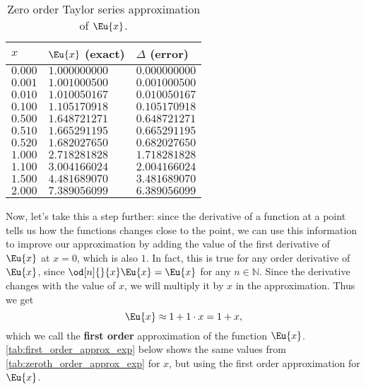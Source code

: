 \begin{table}
  \caption{Zero order Taylor series approximation of $\Eu{x}$.}
  \label{tab:zeroth_order_approx_exp}
  \begin{center}
    {
      \renewcommand{\arraystretch}{1.2}
      \begin{tabular}[c]{lll}
        \toprule
        $x$ & $\Eu{x}$ (exact) & $\Delta$ (error) \\
        \midrule
        $0.000$ & $1.000000000$ & $0.000000000$\\
        $0.001$ & $1.001000500$ & $0.001000500$\\
        $0.010$ & $1.010050167$ & $0.010050167$\\
        $0.100$ & $1.105170918$ & $0.105170918$\\
        $0.500$ & $1.648721271$ & $0.648721271$\\
        $0.510$ & $1.665291195$ & $0.665291195$\\
        $0.520$ & $1.682027650$ & $0.682027650$\\
        $1.000$ & $2.718281828$ & $1.718281828$\\
        $1.100$ & $3.004166024$ & $2.004166024$\\
        $1.500$ & $4.481689070$ & $3.481689070$\\
        $2.000$ & $7.389056099$ & $6.389056099$\\
        \bottomrule
      \end{tabular}
    }
  \end{center}
\end{table}

Now, let's take this a step further: since the derivative of a function at a point tells us how the functions changes close to the point, we can use this information to improve our approximation by adding the value of the first derivative of $\Eu{x}$ at $x=0$, which is also $1$. In fact, this is true for any order derivative of $\Eu{x}$, since $\od[n]{}{x}\Eu{x}=\Eu{x}$ for any $n\in\mathbb{N}$. Since the derivative changes with the value of $x$, we will multiply it by $x$ in the approximation. Thus we get
\begin{equation}
  \Eu{x} \approx 1 + 1\cdot x = 1+x,
  \label{eq:first_order_approx_exp}
\end{equation}
which we call the \textbf{first order} approximation of the function $\Eu{x}$. \autoref{tab:first_order_approx_exp} below shows the same values from \autoref{tab:zeroth_order_approx_exp} for $x$, but using the first order approximation for $\Eu{x}$.

